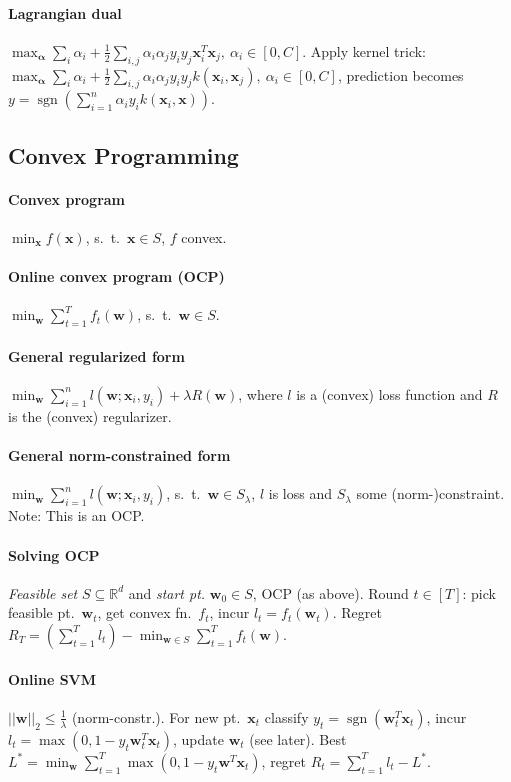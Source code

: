 \documentclass[10pt]{scrartcl}
\DeclareMathOperator{\sign}{sgn}
\newcommand{\R}{\mathbb{R}}
\begin{document}
\begin{multicols}{3}
\paragraph{Lagrangian dual}
$\max_{\bm \alpha} \sum_{i}\alpha_i + \frac{1}{2}\sum_{i,j}\alpha_i\alpha_j y_i y_j \bm x_i^T\bm x_j,\ \alpha_i \in [0,C]$.
Apply kernel trick: 
$\max_{\bm \alpha} \sum_{i}\alpha_i + \frac{1}{2}\sum_{i,j}\alpha_i\alpha_j y_i y_j k(\bm x_i, \bm x_j),\ \alpha_i \in [0,C]$, prediction becomes $y = \sign(\sum_{i=1}^{n}\alpha_i y_i k(\bm x_i,\bm x))$.

\subsection{Convex Programming}
\paragraph{Convex program} $\min_{\bm x} f(\bm x)$, s.\ t.\ $\bm x \in S$, $f$ convex.
\paragraph{Online convex program (OCP)} $\min_{\bm w} \sum_{t=1}^{T} f_t(\bm w)$, s.\ t.\ $\bm w \in S$.
\paragraph{General regularized form} $\min_{\bm w} \sum_{i=1}^{n} l(\bm w; \bm x_i, y_i) + \lambda R(\bm w)$, where $l$ is a (convex) loss function and $R$ is the (convex) regularizer.
\paragraph{General norm-constrained form} $\min_{\bm w} \sum_{i=1}^{n} l(\bm w; \bm x_i, y_i)$, s.\ t.\ $\bm w \in S_\lambda$, $l$ is loss and $S_\lambda$ some (norm-)constraint. Note: This is an OCP.

\paragraph{Solving OCP}
\emph{Feasible set} $S \subseteq \R^d$ and \emph{start pt.} $\bm w_0 \in S$, OCP (as above).
Round $t \in [T]$: pick feasible pt.\ $\bm w_t$, get convex fn.\ $f_t$, incur $l_t = f_t(\bm w_t)$.
Regret $R_T = (\sum_{t=1}^{T} l_t) - \min_{\bm w \in S}\sum_{t=1}^{T}f_t(\bm w)$.

\paragraph{Online SVM}
$||\bm w||_2 \leq \frac{1}{\lambda}$ (norm-constr.). For new pt.\ $\bm x_t$ classify $y_t = \sign(\bm w_t^T \bm x_t)$,
incur $l_t = \max(0,1-y_t \bm w_t^T \bm x_t)$, update $\bm w_t$ (see later).
Best $L^* = \min_{\bm w}\sum_{t=1}^{T}\max(0,1-y_t \bm w^T \bm x_t)$, regret $R_t = \sum_{t=1}^{T} l_t - L^*$.


\end{multicols}
\end{document}
